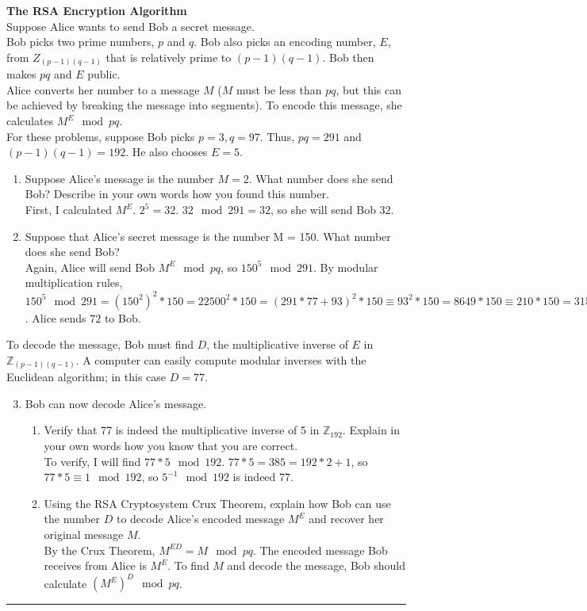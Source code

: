 \documentclass{article}
\begin{document}
\textbf{The RSA Encryption Algorithm}\\ 
Suppose Alice wants to send Bob a secret message.\\
Bob picks two prime numbers, $p$ and $q$. Bob also picks an encoding number, $E$, from $Z_{(p-1)(q-1)}$ that is relatively prime to $(p-1)(q-1)$. Bob then makes $pq$ and $E$ public.\\
Alice converts her number to a message $M$ ($M$ must be less than $pq$, but this can be achieved by breaking the message into segments). To encode this message, she calculates $M^{E} \mod{pq}$. \vspace{8pt}\\ 
For these problems, suppose Bob picks $p = 3, q = 97$. Thus, $pq = 291$ and $(p-1)(q-1) = 192$. He also chooses $E = 5$.
\begin{enumerate}
    \item Suppose Alice's message is the number $M = 2$. What number does she send Bob? Describe in your own words how you found this number.\\
    First, I calculated $M^{E}$. $2^{5} = 32$. $32 \mod{291} = 32$, so she will send Bob $32$.
    \item Suppose that Alice’s secret message is the number M = 150. What number does she send Bob?\\
    Again, Alice will send Bob $M^{E} \mod{pq}$, so $150^{5} \mod 291$. By modular multiplication rules, $150^{5} \mod{291} = (150^{2})^{2}*150 = 22500^{2} * 150 = (291*77 + 93)^{2} * 150 \equiv 93^2 * 150 = 8649 * 150 \equiv 210 * 150 = 31500 \equiv 72 \mod{291}$. Alice sends $72$ to Bob.
\end{enumerate}
To decode the message, Bob must find $D$, the multiplicative inverse of $E$ in $\mathbb{Z}_{(p-1)(q-1)}$. A computer can easily compute modular inverses with the Euclidean algorithm; in this case $D=77$.
\begin{enumerate}
\setcounter{enumi}{2}
    \item Bob can now decode Alice's message.
    \begin{enumerate}
        \item Verify that 77 is indeed the multiplicative inverse of 5 in $\mathbb{Z}_{192}$. Explain in your own words how you know that you are correct.\\
        To verify, I will find $77 * 5 \mod{192}$. $77*5 = 385 = 192*2 + 1$, so $77 * 5 \equiv 1 \mod{192}$, so $5^{-1} \mod{192}$ is indeed 77.
        \item Using the RSA Cryptosystem Crux Theorem, explain how Bob can use the number $D$ to decode Alice’s encoded message $M^E$ and recover her original message $M$.\\
        By the Crux Theorem, $M^{ED} = M \mod{pq}$. The encoded message Bob receives from Alice is $M^{E}$. To find $M$ and decode the message, Bob should calculate $(M^{E})^{D} \mod{pq}$.
    \end{enumerate}
\end{enumerate} \hrule \vspace{8pt}   
\end{document}
